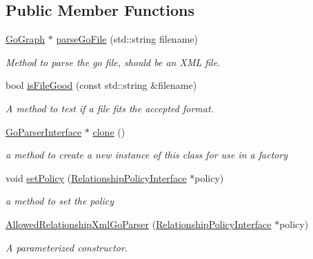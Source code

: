 \subsection*{Public Member Functions}
\begin{DoxyCompactItemize}
\item 
\hyperlink{classGoGraph}{Go\+Graph} $\ast$ \hyperlink{classAllowedRelationshipXmlGoParser_ad6e002e7cd0994866b62dba0896d3d24}{parse\+Go\+File} (std\+::string filename)
\begin{DoxyCompactList}\small\item\em Method to parse the go file, should be an X\+ML file. \end{DoxyCompactList}\item 
bool \hyperlink{classAllowedRelationshipXmlGoParser_a75e964bc34f575bc6c00c56b43f91d0e}{is\+File\+Good} (const std\+::string \&filename)
\begin{DoxyCompactList}\small\item\em A method to test if a file fits the accepted format. \end{DoxyCompactList}\item 
\hyperlink{classGoParserInterface}{Go\+Parser\+Interface} $\ast$ \hyperlink{classAllowedRelationshipXmlGoParser_a3c330bc9f1ccf6422488bf1ea593f52a}{clone} ()
\begin{DoxyCompactList}\small\item\em a method to create a new instance of this class for use in a factory \end{DoxyCompactList}\item 
void \hyperlink{classAllowedRelationshipXmlGoParser_a463df4ceee68bf1321c982812f77eed2}{set\+Policy} (\hyperlink{classRelationshipPolicyInterface}{Relationship\+Policy\+Interface} $\ast$policy)
\begin{DoxyCompactList}\small\item\em a method to set the policy \end{DoxyCompactList}\item 
\hyperlink{classAllowedRelationshipXmlGoParser_a51bd1af3274c80d1600e0f3b88815ef4}{Allowed\+Relationship\+Xml\+Go\+Parser} (\hyperlink{classRelationshipPolicyInterface}{Relationship\+Policy\+Interface} $\ast$policy)
\begin{DoxyCompactList}\small\item\em A parameterized constructor. \end{DoxyCompactList}\end{DoxyCompactItemize}


